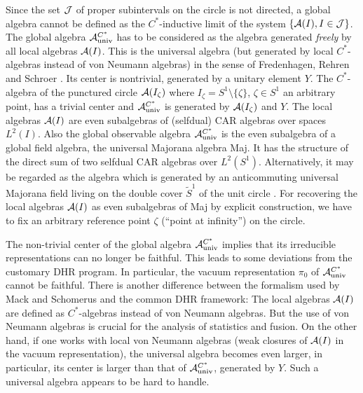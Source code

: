 \documentclass[10pt,a4paper]{article}
\begin{document}
Since the set ${\cal J}$ of proper subintervals
on the circle is not directed, a global algebra
cannot be defined as the $C^*$-inductive
limit of the system $\{{\cal A}(I),I\in{\cal J}\}$.
The global algebra ${\cal A}_{\rm univ}^{C^*}$
has to be considered as the algebra generated
{\sl freely} by all local algebras
${\cal A}(I)$. This is the universal algebra
(but generated by local $C^*$-algebras instead
of von Neumann algebras) in the sense of
Fredenhagen, Rehren and Schroer \cite{FRS2,Fred3}.
Its center is nontrivial, generated by a unitary
element $Y$. The  $C^*$-algebra of the punctured
circle ${\cal A}(I_\zeta)$ where $I_\zeta=S^1
\setminus\{\zeta\}$, $\zeta\in S^1$ an arbitrary point,
has a trivial center and ${\cal A}_{\rm univ}^{C^*}$
is generated by ${\cal A}(I_\zeta)$ and $Y$.
The local algebras ${\cal A}(I)$ are even subalgebras
of (selfdual) CAR algebras over spaces $L^2(I)$.
Also the global observable algebra
${\cal A}_{\rm univ}^{C^*}$ is the even subalgebra
of a global field algebra, the universal
Majorana algebra {\sf Maj}. It has the structure of
the direct sum of two selfdual
CAR algebras over $L^2(S^1)$. Alternatively, it may be
regarded as the algebra which is generated by an
anticommuting universal Majorana field living on the
double cover $\tilde{S}^1$ of the unit circle
\cite{MS1,MS2}. For recovering the local algebras
${\cal A}(I)$ as even subalgebras of {\sf Maj} by
explicit construction, we have to fix an
arbitrary reference point $\zeta$ (``point at
infinity'') on the circle.

The non-trivial center of the global algebra
${\cal A}_{\rm univ}^{C^*}$ implies that its irreducible
representations can no longer be faithful. This
leads to some deviations from the customary DHR
program. In particular, the vacuum representation $\pi_0$
of ${\cal A}_{\rm univ}^{C^*}$ cannot be faithful.
There is another difference between the formalism used
by Mack and Schomerus and the common DHR framework:
The local algebras ${\cal A}(I)$ are defined as
$C^*$-algebras instead of von Neumann algebras.
But the use of von Neumann algebras is crucial
for the analysis of statistics and fusion. On the
other hand, if one works with local von Neumann
algebras  (weak closures of
${\cal A}(I)$ in the vacuum representation), the
universal algebra becomes even larger, in particular,
its center is larger than that of
${\cal A}_{\rm univ}^{C^*}$,
generated by $Y$. Such a universal algebra appears
to be hard to handle.
\end{document}
